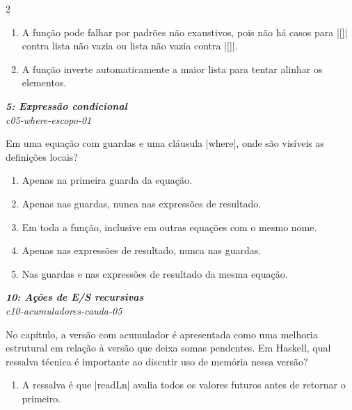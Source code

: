 \documentclass[a4paper,10pt,brazil]{article}
\begin{document}
\begin{multicols}{2}
\begin{enumerate}
  \item A função pode falhar por padrões não exaustivos, pois não há casos para \haskellinline|[]| contra lista não vazia ou lista não vazia contra \haskellinline|[]|.

  \item A função inverte automaticamente a maior lista para tentar alinhar os elementos.


\end{enumerate}

\begin{flushright}
  \footnotesize
  \textit{\textbf{5: Expressão condicional}}\\
  \textit{c05-where-escopo-01}\\

\end{flushright}
Em uma equação com guardas e uma cláusula \haskellinline|where|, onde são visíveis as definições locais?

\begin{enumerate}
  \item Apenas na primeira guarda da equação.

  \item Apenas nas guardas, nunca nas expressões de resultado.

  \item Em toda a função, inclusive em outras equações com o mesmo nome.

  \item Apenas nas expressões de resultado, nunca nas guardas.

  \item Nas guardas e nas expressões de resultado da mesma equação.


\end{enumerate}

\begin{flushright}
  \footnotesize
  \textit{\textbf{10: Ações de E/S recursivas}}\\
  \textit{c10-acumuladores-cauda-05}\\

\end{flushright}
No capítulo, a versão com acumulador é apresentada como uma melhoria estrutural em relação à versão que deixa somas pendentes. Em Haskell, qual ressalva técnica é importante ao discutir uso de memória nessa versão?

\begin{enumerate}
  \item A ressalva é que \haskellinline|readLn| avalia todos os valores futuros antes de retornar o primeiro.


\end{enumerate}
\end{multicols}
\end{document}
